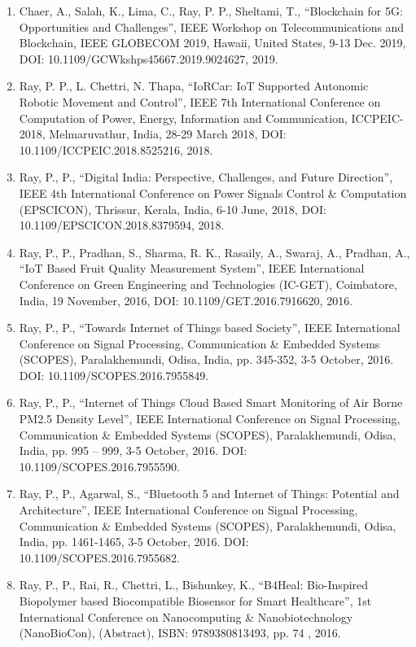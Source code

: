 \documentclass[11pt,a4paper]{moderncv}
\begin{document}
\begin{adjustwidth}{6em}{0pt}
\begin{enumerate}
	\item Chaer, A., Salah, K., Lima, C., Ray, P. P., Sheltami, T., “Blockchain for 5G: Opportunities and Challenges”, IEEE Workshop on Telecommunications and Blockchain, IEEE GLOBECOM 2019, Hawaii, United States, 9-13 Dec. 2019, DOI: 10.1109/GCWkshps45667.2019.9024627, 2019. 
	
	\item Ray, P. P., L. Chettri, N. Thapa, “IoRCar: IoT Supported Autonomic Robotic Movement and Control”, IEEE 7th International Conference on Computation of Power, Energy, Information and Communication, ICCPEIC-2018, Melmaruvathur, India, 28-29 March 2018, DOI: 10.1109/ICCPEIC.2018.8525216, 2018. 
	
	\item Ray, P., P., “Digital India: Perspective, Challenges, and Future Direction”, IEEE 4th International Conference on Power Signals Control \& Computation (EPSCICON), Thrissur, Kerala, India, 6-10 June, 2018, DOI: 10.1109/EPSCICON.2018.8379594, 2018.
	
	\item Ray, P., P., Pradhan, S., Sharma, R. K., Rasaily, A., Swaraj, A., Pradhan, A., “IoT Based Fruit Quality Measurement System”, IEEE International Conference on Green Engineering and Technologies (IC-GET), Coimbatore, India, 19 November, 2016, DOI: 10.1109/GET.2016.7916620, 2016.
	
	\item Ray, P., P., “Towards Internet of Things based Society”, IEEE International Conference on Signal Processing, Communication \& Embedded Systems (SCOPES), Paralakhemundi, Odisa, India, pp. 345-352, 3-5 October, 2016. DOI: 10.1109/SCOPES.2016.7955849.
	
	\item Ray, P., P., “Internet of Things Cloud Based Smart Monitoring of Air Borne PM2.5 Density Level”, IEEE International Conference on Signal Processing, Communication \& Embedded Systems (SCOPES), Paralakhemundi, Odisa, India, pp. 995 – 999, 3-5 October, 2016. DOI: 10.1109/SCOPES.2016.7955590.
	
	\item Ray, P., P., Agarwal, S., “Bluetooth 5 and Internet of Things: Potential and Architecture”, IEEE International Conference on Signal Processing, Communication \& Embedded Systems (SCOPES), Paralakhemundi, Odisa, India, pp. 1461-1465, 3-5 October, 2016. DOI: 10.1109/SCOPES.2016.7955682.
	
	\item Ray, P., P., Rai, R., Chettri, L., Bishunkey, K., “B4Heal: Bio-Inspired Biopolymer based Biocompatible Biosensor for Smart Healthcare”, 1st International Conference on Nanocomputing \& Nanobiotechnology (NanoBioCon), (Abstract), ISBN: 9789380813493, pp. 74 , 2016.
	

\end{enumerate}
\end{adjustwidth}
\end{document}
